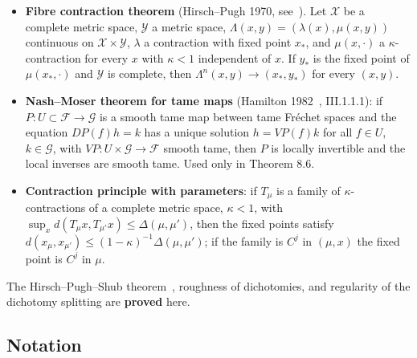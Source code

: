 \documentclass[11pt,a4paper]{article}
\theoremstyle{plain}
\theoremstyle{definition}
\theoremstyle{remark}
\numberwithin{equation}{section}
\numberwithin{figure}{section}
\begin{document}
\begin{itemize}
\item [(FCT)] \textbf{Fibre contraction theorem} (Hirsch–Pugh 1970, see~\cite{pugh1970}). Let $\mathcal X$ be a complete metric space, $\mathcal Y$ a metric space, $\Lambda(x,y)=(\lambda(x),\mu(x,y))$ continuous on $\mathcal X\times\mathcal Y$, $\lambda$ a contraction with fixed point $x_*$, and $\mu(x,\cdot)$ a $\kappa$-contraction for every $x$ with $\kappa<1$ independent of $x$. If $y_*$ is the fixed point of $\mu(x_*,\cdot)$ and $\mathcal Y$ is complete, then $\Lambda^n(x,y)\to(x_*,y_*)$ for every $(x,y)$.

\item [(NM)] \textbf{Nash–Moser theorem for tame maps} (Hamilton 1982~\cite{hal1982}, III.1.1.1): if $P:U\subset\mathcal F\to\mathcal G$ is a smooth tame map between tame Fréchet spaces and the equation $DP(f)h=k$ has a unique solution $h=VP(f)k$ for all $f\in U$, $k\in\mathcal G$, with $VP:U\times\mathcal G\to\mathcal F$ smooth tame, then $P$ is locally invertible and the local inverses are smooth tame. Used only in Theorem 8.6.

\item [(CT)] \textbf{Contraction principle with parameters}: if $T_\mu$ is a family of $\kappa$-contractions of a complete metric space, $\kappa<1$, with $\sup_x d(T_\mu x,T_{\mu'}x)\le\Delta(\mu,\mu')$, then the fixed points satisfy $d(x_\mu,x_{\mu'})\le(1-\kappa)^{-1}\Delta(\mu,\mu')$; if the family is $C^j$ in $(\mu,x)$ the fixed point is $C^j$ in $\mu$.
\end{itemize}

The Hirsch–Pugh–Shub theorem~\cite{hir77}, roughness of dichotomies, and regularity of the dichotomy splitting are \textbf{proved} here.

\subsection{Notation}
\end{document}
